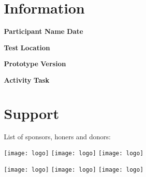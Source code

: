 
\section*{Information}

\vspace{1cm}

\textbf{Participant Name} \hfill \textbf{Date}

\vspace{2.5cm}

\textbf{Test} \hfill \textbf{Location}

\vspace{2.5cm}

\textbf{Prototype} \hfill \textbf{Version}

\vspace{2.5cm}

\textbf{Activity} \hfill \textbf{Task}

\vfill


\section*{Support}

\hfill

List of sponsors, honers and donors:

\hfill


\hfill

\texttt{[image: logo]} \hfill \texttt{[image: logo]} \hfill \texttt{[image: logo]}

\texttt{[image: logo]} \hfill \texttt{[image: logo]} \hfill \texttt{[image: logo]}

\hfill

